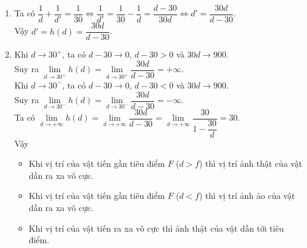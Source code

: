 \begin{bt}
{\begin{enumerate}
			\item Ta có $\dfrac{1}{d}+\dfrac{1}{d'}=\dfrac{1}{30} \Leftrightarrow \dfrac{1}{d'} = \dfrac{1}{30} - \dfrac{1}{d} = \dfrac{d-30}{30d} \Leftrightarrow d'= \dfrac{30d}{d-30}$. \\
			Vậy $d'=h(d) = \dfrac{30d}{d-30}$.
			\item 
			Khi $d\to 30^+$, ta có $d-30 \to 0$, $d-30 >0$ và $30d \to 900$.\\
			Suy ra $\lim\limits _{d \rightarrow 30^{+}} h(d) = \lim\limits _{d \rightarrow 30^{+}} \dfrac{30d}{d-30} = +\infty$. \\
			Khi $d\to 30^-$, ta có $d-30 \to 0$, $d-30 <0$ và $30d \to 900$.\\
			Suy ra $\lim\limits _{d \rightarrow 30^{-}} h(d) = \lim\limits _{d \rightarrow 30^{-}} \dfrac{30d}{d-30} = -\infty$. \\
			Ta có $\lim\limits _{d \rightarrow +\infty} h(d) =  \lim\limits _{d \rightarrow +\infty} \dfrac{30d}{d-30} = \lim\limits _{d \rightarrow +\infty}  \dfrac{30}{1-\dfrac{30}{d}} =30$. \\
			Vậy 
			\begin{itemize}
				\item  Khi vị trí của vật tiến gần  tiêu điểm $F$ ($d >f$) thì vị trí ảnh thật của vật dần ra xa vô cực. 
				\item  Khi vị trí của vật tiến gần  tiêu điểm $F$ ($d <f$) thì vị trí ảnh ảo của vật dần ra xa vô cực. 
				\item  Khi vị trí của vật tiến ra xa vô cực thì  ảnh thật của vật dần tới tiêu điểm. 
			\end{itemize}
		\end{enumerate}
	}
\end{bt}



